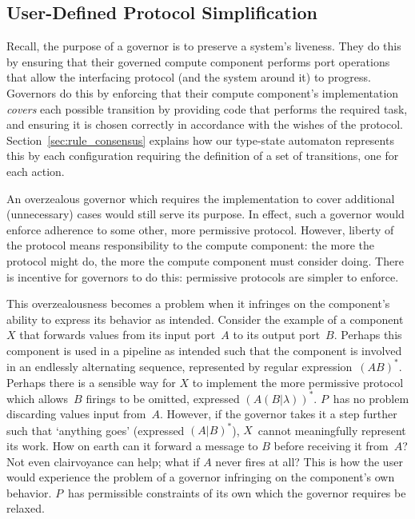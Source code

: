 \subsection{User-Defined Protocol Simplification}
\label{sec:user_defined_simplification}
Recall, the purpose of a governor is to preserve a system's liveness.
They do this by ensuring that their governed compute component performs port operations that allow the interfacing protocol (and the system around it) to progress. 
Governors do this by enforcing that their compute component's implementation \textit{covers} each possible transition by providing code that performs the required task, and ensuring it is chosen correctly in accordance with the wishes of the protocol. Section~\ref{sec:rule_consensus} explains how our type-state automaton represents this by each configuration requiring the definition of a set of transitions, one for each action.

An overzealous governor which requires the implementation to cover additional (unnecessary) cases would still serve its purpose. In effect, such a governor would enforce adherence to some other, more permissive protocol. However, liberty of the protocol means responsibility to the compute component: the more the protocol might do, the more the compute component must consider doing. There is incentive for governors to do this: permissive protocols are simpler to enforce.

This overzealousness becomes a problem when it infringes on the component's ability to express its behavior as intended. Consider the example of a component~$X$ that forwards values from its input port~$A$ to its output port~$B$. Perhaps this component is used in a pipeline as intended such that the component is involved in an endlessly alternating sequence, represented by regular expression~$(AB)^*$. Perhaps there is a sensible way for $X$ to implement the more permissive protocol which allows~$B$ firings to be omitted, expressed $(A(B|\lambda{}))^*$. $P$~has no problem discarding values input from~$A$. However, if the governor takes it a step further such that `anything goes' (expressed $(A|B)^*$), $X$~cannot meaningfully represent its work. How on earth can it forward a message to $B$ before receiving it from~$A$? Not even clairvoyance can help; what if $A$ never fires at all? This is how the user would experience the problem of a governor infringing on the component's own behavior. $P$~has permissible constraints of its own which the governor requires be relaxed. 



